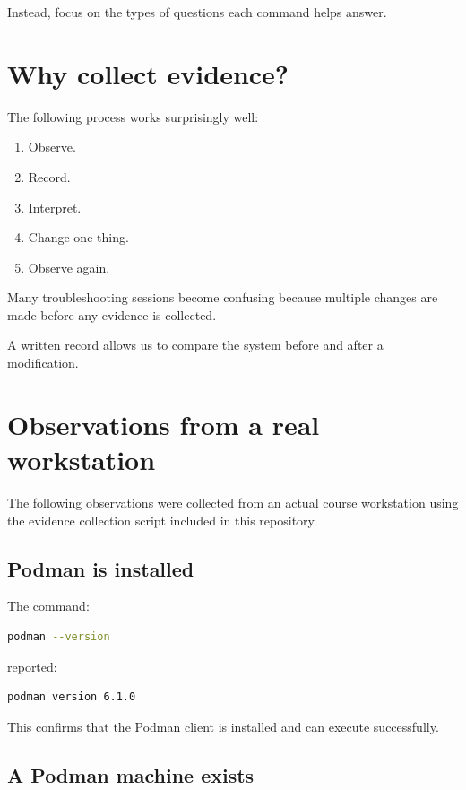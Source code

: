 Instead, focus on the types of questions each command helps answer.

\section{Why collect evidence?}

The following process works surprisingly well:

\begin{enumerate}
  \item Observe.
  \item Record.
  \item Interpret.
  \item Change one thing.
  \item Observe again.
\end{enumerate}

Many troubleshooting sessions become confusing because multiple changes are made before any evidence is collected.

A written record allows us to compare the system before and after a modification.

\section{Observations from a real workstation}

The following observations were collected from an actual course workstation using the evidence collection script included in this repository.

\subsection{Podman is installed}

The command:

\begin{lstlisting}[language=bash]
podman --version
\end{lstlisting}

reported:

\begin{lstlisting}
podman version 6.1.0
\end{lstlisting}

This confirms that the Podman client is installed and can execute successfully.

\subsection{A Podman machine exists}

